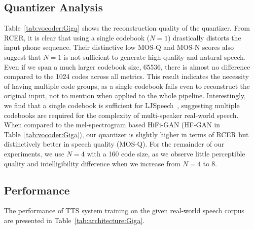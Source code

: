 \documentclass[letterpaper]{article} %
\begin{document}
\subsection{Quantizer Analysis}
\label{ssec:quantana}

Table~\ref{tab:vocoder:Giga} shows the reconstruction quality of the quantizer.
From RCER, it is clear that using a single codebook ($N=1$) drastically distorts the input phone sequence.
Their distinctive low MOS-Q and MOS-N scores also suggest that $N=1$ is not sufficient to generate high-quality and natural speech.
Even if we span a much larger codebook size, 65536, there is almost no difference compared to the 1024 codes across all metrics.
This result indicates the necessity of having multiple code groups, as a single codebook fails even to reconstruct the original input, not to mention when applied to the whole pipeline.
Interestingly, we find that a single codebook is sufficient for LJSpeech~\cite{ljspeech17}, suggesting multiple codebooks are required for the complexity of multi-speaker real-world speech.
When compared to the mel-spectrogram based HiFi-GAN (HF-GAN in Table~\ref{tab:vocoder:Giga}), our quantizer is slightly higher in terms of RCER but distinctively better in speech quality (MOS-Q).
For the remainder of our experiments, we use $N=4$ with a 160 code size, as we observe little perceptible quality and intelligibility difference when we increase from $N=4$ to $8$.



\subsection{Performance}
\label{ssec:performance}
The performance of TTS system training on the given real-world speech corpus are presented in Table~\ref{tab:architecture:Giga}.
\end{document}

